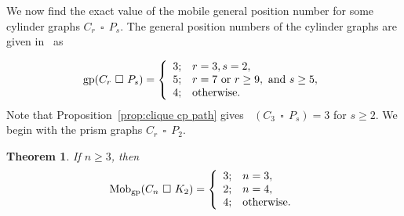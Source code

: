 \documentclass[a4paper,12pt]{article}
\DeclareMathOperator{\mob}{Mob_{gp}}
\DeclareMathOperator{\gp}{gp}
\DeclareMathOperator{\cp}{\,\square\,}
\newtheorem{theorem}{Theorem}[section]
\theoremstyle{definition}
\begin{document}
	
	
	We now find the exact value of the mobile general position number for some cylinder graphs $C_r \cp P_s$. The general position numbers of the cylinder graphs are given in~\cite{klavzar-2021} as
	
	$$\gp (C_r\cp P_s) = \left\{
	\begin{array}{ll}
		3;     &  r = 3, s = 2, \\
		5;     &  r = 7 \text{ or } r \geq 9, \text{ and } s \geq 5, \\
		4;     & {\rm otherwise}.
	\end{array} \right.
	$$
	Note that Proposition~\ref{prop:clique cp path} gives $\mob (C_3 \cp P_s) = 3$ for $s \geq 2$. We begin with the prism graphs $C_r \cp P_2$.
	
	\begin{theorem}
		\label{thm:prisms-cycles}
		If $n\ge 3$, then 
		$$\mob(C_n\cp K_2) = \left\{
		\begin{array}{ll}
			3;     &  n=3, \\
			2;     &  n=4, \\
			4;     & {\rm otherwise}.
		\end{array} \right.
		$$
	\end{theorem}
	
\end{document}
